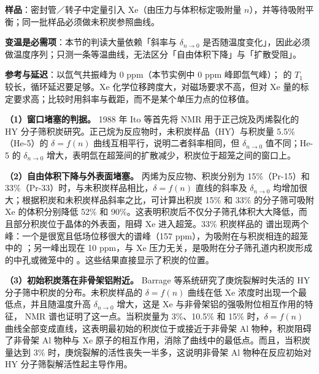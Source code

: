\begin{measure}
\textbf{样品}：密封管／转子中定量引入 Xe（由压力与体积标定吸附量 $n$），并等待吸附平衡；同一批样品必须做未积炭参照曲线。

\textbf{变温是必需项}：本节的判读大量依赖「斜率与 $\delta_{n\to 0}$ 是否随温度变化」，因此必须做温度序列；只测一条等温曲线，无法区分「自由体积下降」与「扩散受阻」。

\textbf{参考与延迟}：以氙气共振峰为 0 ppm（本节实例中 0 ppm 峰即氙气峰）； 的 $T_1$ 较长，循环延迟要足够。Xe 化学位移跨度大，对磁场要求不高，但对 Xe 量的标定要求高；比较时用斜率与截距，而不是某个单压力点的位移值。
\end{measure}

\begin{dataflow}
\textbf{（1）窗口堵塞的判据。} 1988 年 Ito 等首先将  NMR 用于正己烷及丙烯裂化的 HY 分子筛积炭研究。正己烷为反应物时，未积炭样品（HY）与积炭量 5.5\%（He-5）的 $\delta=f(n)$ 曲线互相平行，说明二者斜率相同，但 $\delta_{n\to 0}$ 值不同；He-5 的 $\delta_{n\to 0}$ 增大，表明氙在超笼间的扩散减少，积炭位于超笼之间的窗口上。

\textbf{（2）自由体积下降与外表面堵塞。} 丙烯为反应物、积炭分别为 15\%（Pr-15）和 33\%（Pr-33）时，与未积炭样品相比，$\delta=f(n)$ 直线的斜率及 $\delta_{n\to 0}$ 均增加很大；根据积炭和未积炭样品斜率之比，可计算出积炭 15\% 和 33\% 的分子筛可吸附 Xe 的体积分别降低 52\% 和 90\%。这表明积炭后不仅分子筛孔体积大大降低，而且部分积炭位于晶体的外表面，阻碍 Xe 进入超笼。33\% 积炭样品的  谱出现两个峰：一个是很宽且低场位移很大的谱峰（157 ppm），为吸附在与积炭相连的超笼中的 ；另一峰出现在 10 ppm，与 Xe 压力无关，是吸附在分子筛孔道内积炭形成的中孔或微笼中的 。这些结果直接显示了积炭的位置。

\textbf{（3）初始积炭落在非骨架铝附近。} Barrage 等系统研究了庚烷裂解时失活的 HY 分子筛中积炭的分布。未积炭样品的 $\delta=f(n)$ 曲线在低 Xe 浓度时出现一个最低点，并且随温度升高 $\delta_{n\to 0}$ 增大，这是 Xe 与非骨架铝的强吸附位相互作用的特征， NMR 谱也证明了这一点。当积炭量为 3\%、10.5\% 和 15\% 时，$\delta=f(n)$ 曲线全部变成直线，这表明最初始的积炭位于或接近于非骨架 Al 物种，积炭阻碍了非骨架 Al 物种与 Xe 原子的相互作用，消除了曲线中的最低点。而且，当积炭量达到 3\% 时，庚烷裂解的活性丧失一半多，这说明非骨架 Al 物种在反应初始对 HY 分子筛裂解活性起主导作用。


\end{dataflow}

